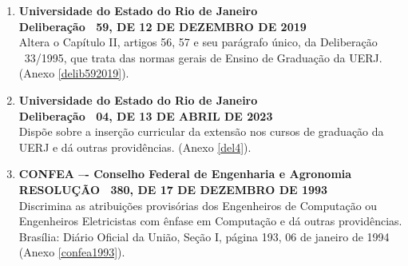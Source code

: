 \begin{enumerate}
      \item \textbf{Universidade do Estado do Rio de Janeiro}  \\
            \textbf{Deliberação ~59, DE 12 DE DEZEMBRO DE 2019} \cite{uerj2019} \\
            Altera o Capítulo II, artigos 56, 57 e seu parágrafo único, da Deliberação ~33/1995, que trata das normas gerais de Ensino de Graduação da UERJ. (Anexo \ref{delib592019}).
      \item \textbf{Universidade do Estado do Rio de Janeiro}  \\
            \textbf{Deliberação ~04, DE 13 DE ABRIL DE 2023} \cite{uerj2023} \\
            Dispõe sobre a inserção curricular da extensão nos cursos de graduação da UERJ e dá outras providências. (Anexo \ref{del4}).
      \item \textbf{CONFEA –- Conselho Federal de Engenharia e Agronomia} \\
            \textbf{RESOLUÇÃO ~380, DE 17 DE DEZEMBRO DE 1993} \cite{confea1993} \\
            Discrimina as atribuições provisórias dos Engenheiros de Computação ou Engenheiros Eletricistas com ênfase em Computação e dá outras providências. Brasília: Diário Oficial da União, Seção I, página 193, 06 de janeiro de 1994 (Anexo \ref{confea1993}).
\end{enumerate}
